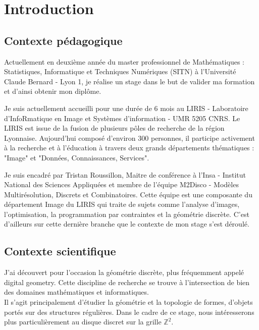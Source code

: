 \section{Introduction}

\subsection{Contexte pédagogique}

Actuellement en deuxième année du master professionnel de Mathématiques : Statistiques, Informatique et Techniques Numériques (SITN) à l’Université Claude Bernard - Lyon 1, je réalise un stage dans le but de valider ma formation et d'ainsi obtenir mon diplôme. \newline

Je suis actuellement accueilli pour une durée de 6 mois au LIRIS - Laboratoire d'InfoRmatique en Image et Systèmes d'information - UMR 5205 CNRS. Le LIRIS est issue de la fusion de plusieurs pôles de recherche de la région Lyonnaise. Aujourd'hui composé d'environ 300 personnes, il participe activement à la recherche et à l'éducation à travers deux grands départements thématiques : "Image" et "Données, Connaissances, Services".\newline

Je suis encadré par Tristan Roussillon, Maitre de conférence à l'Insa - Institut National des Sciences Appliquées et membre de l'équipe M2Disco - Modèles Multirésolution, Discrets et Combinatoires. Cette équipe est une composante du département Image du LIRIS qui traite de sujets comme l'analyse d'images, l'optimisation, la programmation par contraintes et la géométrie discrète. C'est d'ailleurs sur cette dernière branche que le contexte de mon stage s'est déroulé.



\subsection{Contexte scientifique}

J'ai découvert pour l’occasion la géométrie discrète, plus fréquemment appelé digital geometry. Cette discipline de recherche se trouve à l'intersection de bien des domaines mathématiques et informatiques.\\

   
Il s'agit principalement d'étudier la géométrie et la topologie de formes, d'objets portés sur des structures régulières. Dans le cadre de ce stage, nous intéresserons plus particulièrement au disque discret sur la grille $\mathbb{Z}^{2}$. 
